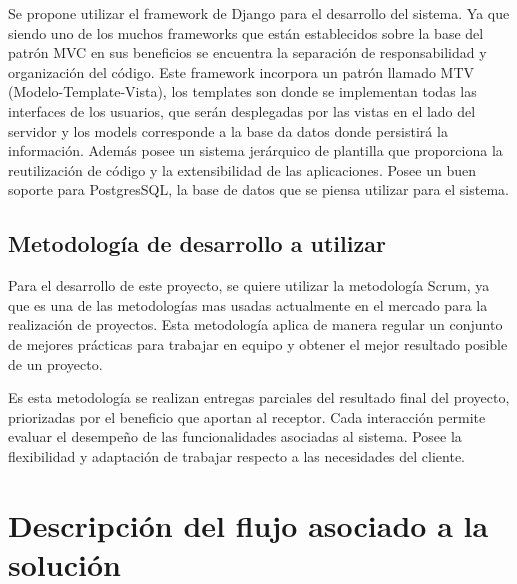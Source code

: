 Se propone utilizar el framework de Django para el desarrollo del sistema. Ya que siendo uno de los muchos frameworks que están establecidos sobre la base del patrón MVC en sus beneficios se encuentra la separación de responsabilidad y organización del código. Este framework incorpora un patrón llamado MTV (Modelo-Template-Vista), los templates son donde se implementan todas las interfaces de los usuarios, que serán desplegadas por las vistas en el lado del servidor y los models corresponde a la base da datos donde persistirá la información. Además posee un sistema jerárquico de plantilla que proporciona la reutilización de código y la extensibilidad de las aplicaciones. Posee un buen soporte para PostgresSQL, la base de datos que se piensa utilizar para el sistema. 

\setlength{\parskip}{0mm}


\newpage
\subsection{Metodología de desarrollo a utilizar}

\setlength{\parskip}{5mm}
Para el desarrollo de este proyecto, se quiere utilizar la metodología Scrum, ya que es una de las metodologías mas usadas actualmente en el mercado para la realización de proyectos. Esta metodología aplica de manera regular un conjunto de mejores prácticas para trabajar en equipo y obtener el mejor resultado posible de un proyecto.

Es esta metodología se realizan entregas parciales del resultado final del proyecto, priorizadas por el beneficio que aportan al receptor. Cada interacción permite evaluar el desempeño de las funcionalidades asociadas al sistema. Posee la flexibilidad y adaptación de trabajar respecto a las necesidades del cliente. 

\setlength{\parskip}{0mm}

\newpage
\section{Descripción del flujo asociado a la solución}


